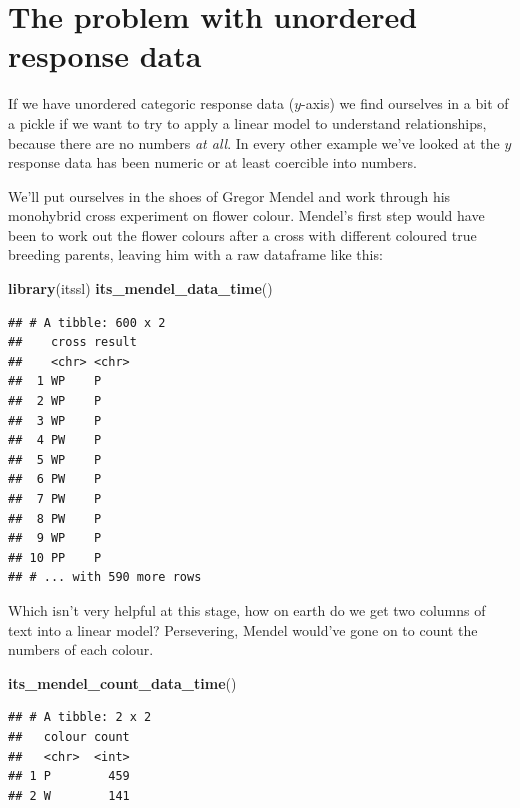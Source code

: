 \documentclass[
]{book}
\newenvironment{Shaded}{\begin{snugshade}}{\end{snugshade}}
\newcommand{\KeywordTok}[1]{\textcolor[rgb]{0.13,0.29,0.53}{\textbf{#1}}}
\newcommand{\NormalTok}[1]{#1}
\begin{document}
\hypertarget{the-problem-with-unordered-response-data}{%
\section{The problem with unordered response data}\label{the-problem-with-unordered-response-data}}

If we have unordered categoric response data (\(y\)-axis) we find ourselves in a bit of a pickle if we want to try to apply a linear model to understand relationships, because there are no numbers \emph{at all}. In every other example we've looked at the \(y\) response data has been numeric or at least coercible into numbers.

We'll put ourselves in the shoes of Gregor Mendel and work through his monohybrid cross experiment on flower colour. Mendel's first step would have been to work out the flower colours after a cross with different coloured true breeding parents, leaving him with a raw dataframe like this:

\begin{Shaded}
\begin{Highlighting}[]
\KeywordTok{library}\NormalTok{(itssl)}
\KeywordTok{its_mendel_data_time}\NormalTok{()}
\end{Highlighting}
\end{Shaded}

\begin{verbatim}
## # A tibble: 600 x 2
##    cross result
##    <chr> <chr> 
##  1 WP    P     
##  2 WP    P     
##  3 WP    P     
##  4 PW    P     
##  5 WP    P     
##  6 PW    P     
##  7 PW    P     
##  8 PW    P     
##  9 WP    P     
## 10 PP    P     
## # ... with 590 more rows
\end{verbatim}

Which isn't very helpful at this stage, how on earth do we get two columns of text into a linear model? Persevering, Mendel would've gone on to count the numbers of each colour.

\begin{Shaded}
\begin{Highlighting}[]
\KeywordTok{its_mendel_count_data_time}\NormalTok{()}
\end{Highlighting}
\end{Shaded}

\begin{verbatim}
## # A tibble: 2 x 2
##   colour count
##   <chr>  <int>
## 1 P        459
## 2 W        141
\end{verbatim}
\end{document}
